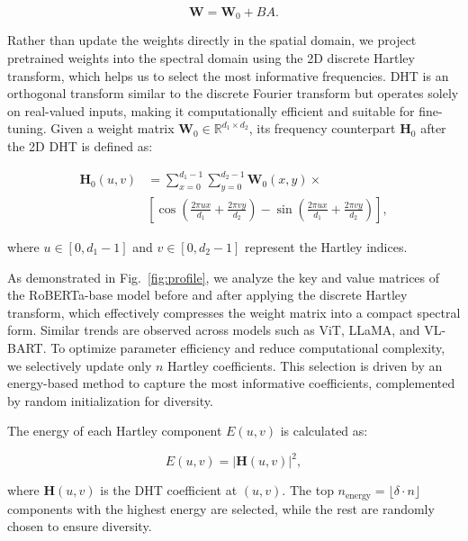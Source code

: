 \begin{small}
\begin{equation}
    \mathbf{W} = \mathbf{W}_0 + BA.
\end{equation}    
\end{small}


Rather than update the weights directly in the spatial domain, we project pretrained weights into the spectral domain using the 2D discrete Hartley transform, which helps us to select the most informative frequencies. 
DHT is an orthogonal transform similar to the discrete Fourier transform but operates solely on real-valued inputs, making it computationally efficient and suitable for fine-tuning. Given a weight matrix $\mathbf{W}_0 \in \mathbb{R}^{d_1 \times d_2}$, 
its frequency counterpart $\mathbf{H}_0$ after the 2D DHT is defined as:

\begin{small}
\begin{equation}
\label{eq2}
\begin{split}
    \mathbf{H}_0(u, v) &= \sum_{x=0}^{d_1-1} \sum_{y=0}^{d_2-1} \mathbf{W}_0(x, y) \times \\
    &\left[ \cos\left( \frac{2\pi ux}{d_1} + \frac{2\pi vy}{d_2} \right) - \sin\left( \frac{2\pi ux}{d_1} + \frac{2\pi vy}{d_2} \right) \right],
\end{split}
\end{equation}
\end{small}
where $u \in [0, d_1-1]$ and $v \in [0, d_2-1]$ represent the Hartley indices.

As demonstrated in Fig.~\ref{fig:profile}, we analyze the key and value matrices of the RoBERTa-base model before and after applying the discrete Hartley transform, which effectively compresses the weight matrix into a compact spectral form. Similar trends are observed across models such as ViT, LLaMA, and VL-BART. To optimize parameter efficiency and reduce computational complexity, we selectively update only $n$ Hartley coefficients. This selection is driven by an energy-based method to capture the most informative coefficients, complemented by random initialization for diversity.

The energy of each Hartley component $E(u,v)$ is calculated as:

\begin{small}
\begin{equation}
    E(u,v) = \left| \mathbf{H}(u,v) \right|^2,
\end{equation}
\end{small}
where $\mathbf{H}(u,v)$ is the DHT coefficient at $(u,v)$. The top $n_{\text{energy}} = \lfloor \delta \cdot n \rfloor$ components with the highest energy are selected, while the rest are randomly chosen to ensure diversity.

